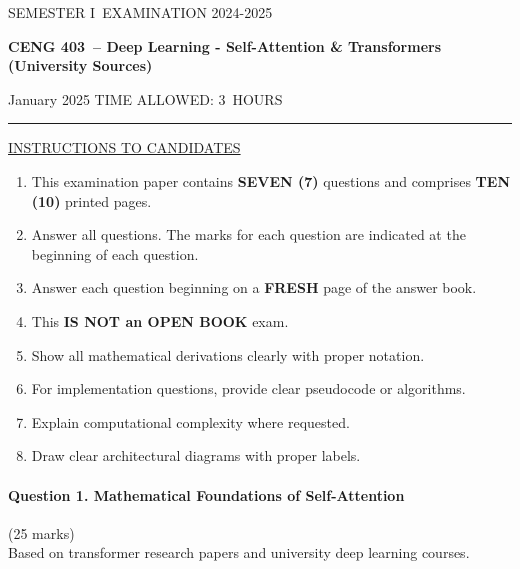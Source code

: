 \documentclass[12pt]{article}
\newcommand{\masunitnumber}{CENG 403}
\newcommand{\examdate}{January 2025}
\newcommand{\academicyear}{2024-2025}
\newcommand{\semester}{I}
\newcommand{\coursename}{Deep Learning - Self-Attention \& Transformers (University Sources)}
\newcommand{\numberofhours}{3}
\begin{document}
\setlength{\headsep}{5truemm}
\setlength{\headheight}{14.5truemm}
\setlength{\voffset}{-0.45truein}
\renewcommand{\headrulewidth}{0.0pt}
\begin{center}
SEMESTER \semester\ EXAMINATION \academicyear
\end{center}
\begin{center}
{\bf \masunitnumber\ -- \coursename}
\end{center}
\vspace{20truemm}
\noindent \examdate\hspace{45truemm} TIME ALLOWED: \numberofhours\ HOURS
\vspace{19truemm}
\hrule
\vspace{19truemm}
\noindent\underline{INSTRUCTIONS TO CANDIDATES}
\vspace{8truemm}
\begin{enumerate}
\item This examination paper contains {\bf SEVEN (7)} questions and comprises 
{\bf TEN (10)} printed pages.
\item Answer all questions. 
The marks for each question are indicated at the beginning of each question.
\item Answer each question beginning on a {\bf FRESH} page of the answer book.
\item This {\bf IS NOT an OPEN BOOK} exam.
\item Show all mathematical derivations clearly with proper notation.
\item For implementation questions, provide clear pseudocode or algorithms.
\item Explain computational complexity where requested.
\item Draw clear architectural diagrams with proper labels.
\end{enumerate}
\newpage
\lhead{}
\rhead{\masunitnumber}
\chead{}
\lfoot{}
\cfoot{\thepage}
\rfoot{}
\setlength{\footskip}{45pt}

\paragraph{Question 1. Mathematical Foundations of Self-Attention}\hfill (25 marks)\\
Based on transformer research papers and university deep learning courses.
\end{document}
